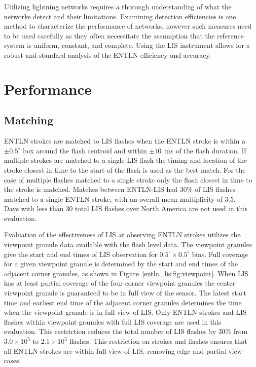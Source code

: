 Utilizing lightning networks requires a thorough understanding of what the networks detect and their limitations.
Examining detection efficiencies is one method to characterize the performance of networks, however such measures need to be used carefully as they often necessitate the assumption that the reference system is uniform, constant, and complete.
Using the LIS instrument allows for a robust and standard analysis of the ENTLN efficiency and accuracy.

\section{Performance}

\subsection{Matching}

ENTLN strokes are matched to LIS flashes when the ENTLN stroke is within a $\pm0.5^\circ$ box around the flash centroid and within $\pm10$~ms of the flash duration.
If multiple strokes are matched to a single LIS flash the timing and location of the stroke closest in time to the start of the flash is used as the best match.
For the case of multiple flashes matched to a single stroke only the flash closest in time to the stroke is matched.
Matches between ENTLN-LIS had 30\% of LIS flashes matched to a single ENTLN stroke, with an overall mean multiplicity of 3.5.
Days with less than 30 total LIS flashes over North America are not used in this evaluation.

Evaluation of the effectiveness of LIS at observing ENTLN strokes utilizes the viewpoint granule data available with the flash level data.
The viewpoint granules give the start and end times of LIS observation for $0.5^\circ \times 0.5^\circ$ bins.
Full coverage for a given viewpoint granule is determined by the start and end times of the adjacent corner granules, as shown in Figure~\ref{entln_lis:fig:viewpoint}.
When LIS has at least partial coverage of the four corner viewpoint granules the center viewpoint granule is guaranteed to be in full view of the sensor.
The latest start time and earliest end time of the adjacent corner granules determines the time when the viewpoint granule is in full view of LIS.
Only ENTLN strokes and LIS flashes within viewpoint granules with full LIS coverage are used in this evaluation.
This restriction reduces the total number of LIS flashes by 30\% from $3.0 \times 10^5$ to $2.1 \times 10^5$ flashes.
This restriction on strokes and flashes ensures that all ENTLN strokes are within full view of LIS, removing edge and partial view cases.

